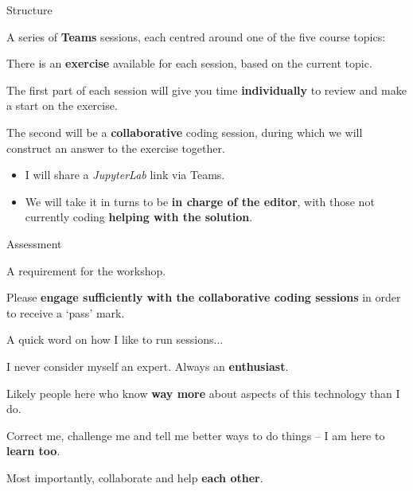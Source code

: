 \documentclass[10pt, dvipsnames, table, aspectratio=169]{beamer}
\begin{document}
\begin{frame}{Structure}

A series of \textbf{Teams} sessions, each centred around one of the five course topics:

\begin{centering}

\begin{table}[h!]

    \centering

    

\end{table}

\end{centering}

\framebreak

There is an \textbf{exercise} available for each session, based on the current topic.

The first part of each session will give you time \textbf{individually} to review and make a start on the exercise.

The second will be a \textbf{collaborative} coding session, during which we will construct an answer to the exercise together.

\begin{itemize}

  \item I will share a \emph{JupyterLab} link via Teams.

  \item We will take it in turns to be \textbf{in charge of the editor}, with those not currently coding \textbf{helping with the solution}.

\end{itemize}

\end{frame}


\begin{frame}[fragile]{Assessment}

A requirement for the workshop.

Please \textbf{engage sufficiently with the collaborative coding sessions} in order to receive a `pass' mark.

\end{frame}


\begin{frame}[fragile]{A quick word on how I like to run sessions...}

I never consider myself an expert. Always an \textbf{enthusiast}.

Likely people here who know \textbf{way more} about aspects of this technology than I do.

Correct me, challenge me and tell me better ways to do things -- I am here to \textbf{learn too}.

Most importantly, collaborate and help \textbf{each other}.

\end{frame}
\end{document}
